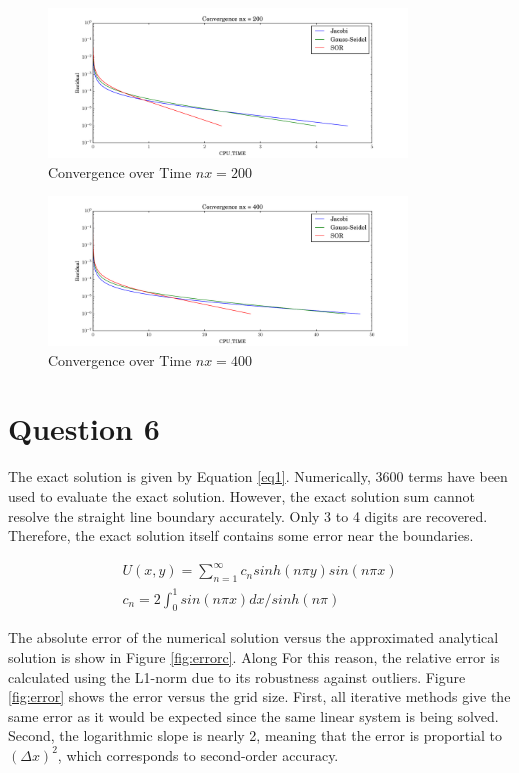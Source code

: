 \documentclass[letterpaper,12pt,]{article}
\begin{document}
\begin{figure}[!h]
    \centering
    \includegraphics[width = 0.85\textwidth]{./Figures/time200.pdf}
    \caption{Convergence over Time $nx = 200$}
    \label{fig:time200}
\end{figure}
\begin{figure}[!h]
    \centering
    \includegraphics[width = 0.85\textwidth]{./Figures/time400.pdf}
    \caption{Convergence over Time $nx = 400$}
    \label{fig:time400}
\end{figure}

\section*{Question 6}

The exact solution is given by Equation \ref{eq1}.
Numerically, 3600 terms have been used to evaluate the exact solution.
However, the exact solution sum cannot resolve the straight line boundary accurately.
Only 3 to 4 digits are recovered.
Therefore, the exact solution itself contains some error near the boundaries.

\begin{equation}
\begin{split}
U(x,y) = \sum^{\infty}_{n=1} c_n sinh(n\pi y) sin(n \pi x)\\
c_n = 2 \int_0^1 sin(n \pi x) dx / sinh(n\pi)
\end{split}
\label{eq1}
\end{equation}

The absolute error of the numerical solution versus the approximated analytical solution is show in Figure \ref{fig:errorc}. Along
For this reason, the relative error is calculated using the L1-norm due to its robustness against outliers.
Figure \ref{fig:error} shows the error versus the grid size.
First, all iterative methods give the same error as it would be expected since the same linear system is being solved.
Second, the logarithmic slope is nearly 2, meaning that the error is proportial to $(\Delta x)^2$, which corresponds to second-order accuracy.
\end{document}
